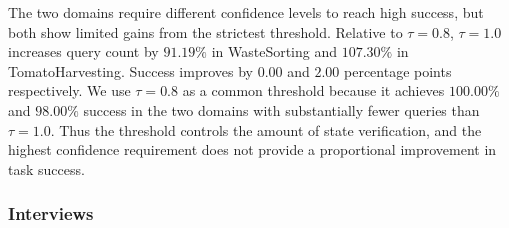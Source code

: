 The two domains require different confidence levels to reach high success, but both show limited gains from the strictest threshold. Relative to $\tau=0.8$, $\tau=1.0$ increases query count by $91.19\%$ in WasteSorting and $107.30\%$ in TomatoHarvesting. Success improves by $0.00$ and $2.00$ percentage points respectively. We use $\tau=0.8$ as a common threshold because it achieves $100.00\%$ and $98.00\%$ success in the two domains with substantially fewer queries than $\tau=1.0$. Thus the threshold controls the amount of state verification, and the highest confidence requirement does not provide a proportional improvement in task success.

\subsubsection{Interviews}\label{exp:interviews}

